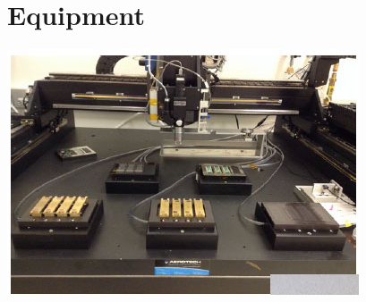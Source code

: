 \documentclass[12pt]{unlsilabsop}
\begin{document}

\section{Equipment}
\begin{center}
\includegraphics{img/gluingSetup.jpg}
\end{center}
\end{document}
